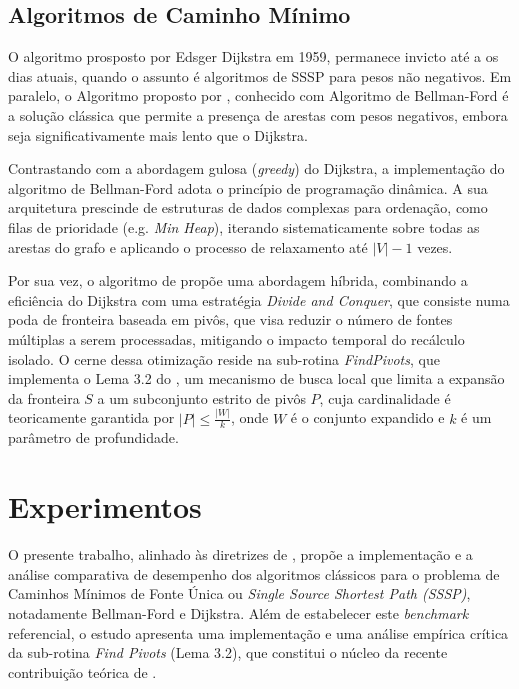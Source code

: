 \documentclass[10pt,a4paper]{article}
\begin{document}
\subsection{Algoritmos de Caminho Mínimo}
O algoritmo prosposto por Edsger Dijkstra em 1959, \citep{dijkstra1959note} permanece invicto até a os dias atuais, quando o assunto é algoritmos de SSSP para pesos não negativos. Em paralelo, o Algoritmo proposto por \citep{ford}, conhecido com Algoritmo de Bellman-Ford é a solução clássica que permite a presença de arestas com pesos negativos, embora seja significativamente mais lento que o Dijkstra.

Contrastando com a abordagem gulosa (\textit{greedy}) do Dijkstra, a implementação do algoritmo de Bellman-Ford adota o princípio de programação dinâmica. A sua arquitetura prescinde de estruturas de dados complexas para ordenação, como filas de prioridade (e.g. \textit{Min Heap}), iterando sistematicamente sobre todas as arestas do grafo e aplicando o processo de relaxamento até $|V| - 1$ vezes. 

Por sua vez, o algoritmo de \citep{breakingTheSortingBarrier} propõe uma abordagem híbrida, combinando a eficiência do Dijkstra com uma estratégia \textit{Divide and Conquer}, que consiste numa poda de fronteira baseada em pivôs, que visa reduzir o número de fontes múltiplas a serem processadas, mitigando o impacto temporal do recálculo isolado. O cerne dessa otimização reside na sub-rotina \textit{FindPivots}, que implementa o Lema 3.2 do \citep{breakingTheSortingBarrier}, um mecanismo de busca local que limita a expansão da fronteira $S$ a um subconjunto estrito de pivôs $P$, cuja cardinalidade é teoricamente garantida por $|P| \le \frac{|W|}{k}$, onde $W$ é o conjunto expandido e $k$ é um parâmetro de profundidade.

\section{Experimentos}

O presente trabalho, alinhado às diretrizes de \citep{TP01}, propõe a implementação e a análise comparativa de desempenho dos algoritmos clássicos para o problema de Caminhos Mínimos de Fonte Única ou \textit{Single Source Shortest Path (SSSP)}, notadamente Bellman-Ford e Dijkstra. Além de estabelecer este \textit{benchmark} referencial, o estudo apresenta uma implementação e uma análise empírica crítica da sub-rotina \textit{Find Pivots} (Lema 3.2), que constitui o núcleo da recente contribuição teórica de \cite{breakingTheSortingBarrier}.
\end{document}

